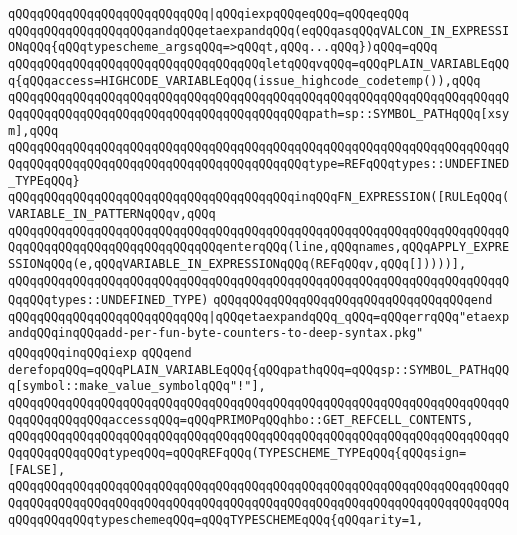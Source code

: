 \verb|qQQqqQQqqQQqqQQqqQQqqQQqqQQq|\verb#|qQQqiexpqQQqeqQQq=qQQqeqQQq#\newline
\newline
\verb|qQQqqQQqqQQqqQQqqQQqandqQQqetaexpandqQQq(eqQQqasqQQqVALCON_IN_EXPRESSIONqQQq{qQQqtypescheme_argsqQQq=>qQQqt,qQQq...qQQq})qQQq=qQQq|\newline
\verb|qQQqqQQqqQQqqQQqqQQqqQQqqQQqqQQqqQQqletqQQqvqQQq=qQQqPLAIN_VARIABLEqQQq{qQQqaccess=HIGHCODE_VARIABLEqQQq(issue_highcode_codetemp()),qQQq|\newline
\verb|qQQqqQQqqQQqqQQqqQQqqQQqqQQqqQQqqQQqqQQqqQQqqQQqqQQqqQQqqQQqqQQqqQQqqQQqqQQqqQQqqQQqqQQqqQQqqQQqqQQqqQQqqQQqqQQqpath=sp::SYMBOL_PATHqQQq[xsym],qQQq|\newline
\verb|qQQqqQQqqQQqqQQqqQQqqQQqqQQqqQQqqQQqqQQqqQQqqQQqqQQqqQQqqQQqqQQqqQQqqQQqqQQqqQQqqQQqqQQqqQQqqQQqqQQqqQQqqQQqqQQqtype=REFqQQqtypes::UNDEFINED_TYPEqQQq}|\newline
\verb|qQQqqQQqqQQqqQQqqQQqqQQqqQQqqQQqqQQqqQQqinqQQqFN_EXPRESSION([RULEqQQq(VARIABLE_IN_PATTERNqQQqv,qQQq|\newline
\verb|qQQqqQQqqQQqqQQqqQQqqQQqqQQqqQQqqQQqqQQqqQQqqQQqqQQqqQQqqQQqqQQqqQQqqQQqqQQqqQQqqQQqqQQqqQQqqQQqqQQqenterqQQq(line,qQQqnames,qQQqAPPLY_EXPRESSIONqQQq(e,qQQqVARIABLE_IN_EXPRESSIONqQQq(REFqQQqv,qQQq[]))))],|\newline
\verb|qQQqqQQqqQQqqQQqqQQqqQQqqQQqqQQqqQQqqQQqqQQqqQQqqQQqqQQqqQQqqQQqqQQqqQQqqQQqtypes::UNDEFINED_TYPE)|\newline
\verb|qQQqqQQqqQQqqQQqqQQqqQQqqQQqqQQqqQQqend|\newline
\verb|qQQqqQQqqQQqqQQqqQQqqQQqqQQq|\verb#|qQQqetaexpandqQQq_qQQq=qQQqerrqQQq"etaexpandqQQqinqQQqadd-per-fun-byte-counters-to-deep-syntax.pkg"#\newline
\verb|qQQqqQQqinqQQqiexp|\newline
\verb|qQQqend|\newline
\newline
\newline
\verb|derefopqQQq=qQQqPLAIN_VARIABLEqQQq{qQQqpathqQQq=qQQqsp::SYMBOL_PATHqQQq[symbol::make_value_symbolqQQq"!"],|\newline
\verb|qQQqqQQqqQQqqQQqqQQqqQQqqQQqqQQqqQQqqQQqqQQqqQQqqQQqqQQqqQQqqQQqqQQqqQQqqQQqqQQqqQQqaccessqQQq=qQQqPRIMOPqQQqhbo::GET_REFCELL_CONTENTS,|\newline
\verb|qQQqqQQqqQQqqQQqqQQqqQQqqQQqqQQqqQQqqQQqqQQqqQQqqQQqqQQqqQQqqQQqqQQqqQQqqQQqqQQqqQQqtypeqQQq=qQQqREFqQQq(TYPESCHEME_TYPEqQQq{qQQqsign=[FALSE],|\newline
\verb|qQQqqQQqqQQqqQQqqQQqqQQqqQQqqQQqqQQqqQQqqQQqqQQqqQQqqQQqqQQqqQQqqQQqqQQqqQQqqQQqqQQqqQQqqQQqqQQqqQQqqQQqqQQqqQQqqQQqqQQqqQQqqQQqqQQqqQQqqQQqqQQqqQQqqQQqtypeschemeqQQq=qQQqTYPESCHEMEqQQq{qQQqarity=1,|\newline
